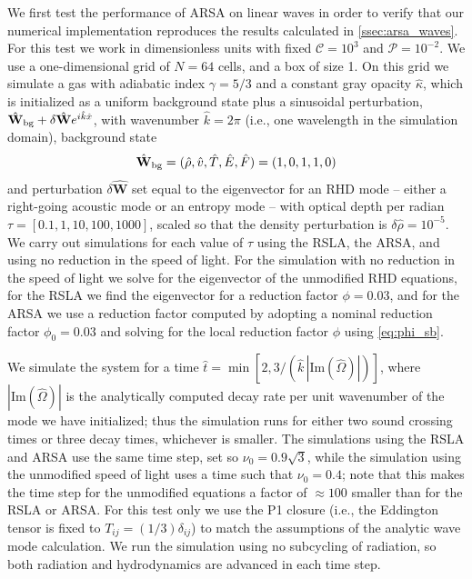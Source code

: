 \documentclass[preprint,12pt,authoryear]{elsarticle}
\newcommand{\hatt}{\hat{t}}
\newcommand{\hrho}{\hat{\rho}}
\newcommand{\hk}{\hat{k}}
\newcommand{\hE}{\hat{E}}
\newcommand{\hv}{\hat{v}}
\newcommand{\hF}{\hat{F}}
\newcommand{\hx}{\hat{x}}
\newcommand{\hT}{\hat{T}}
\newcommand{\hOmega}{\hat{\Omega}}
\newcommand{\hvecW}{{\hat{\mathbf{W}}}}
\newcommand{\calC}{\mathcal{C}}
\newcommand{\calP}{\mathcal{P}}
\begin{document}
We first test the performance of ARSA on linear waves in order to verify that our numerical implementation reproduces the results calculated in \autoref{ssec:arsa_waves}. For this test we work in dimensionless units with fixed $\calC = 10^3$ and $\calP = 10^{-2}$. We use a one-dimensional grid of $N=64$ cells, and a box of size 1. On this grid we simulate a gas with adiabatic index $\gamma=5/3$ and a constant gray opacity $\hat{\kappa}$, which is initialized as a uniform background state plus a sinusoidal perturbation, $\hvecW_{\rm bg} + \delta\hvecW e^{i\hk\hx}$, with wavenumber $\hk = 2\pi$ (i.e., one wavelength in the simulation domain), background state
\begin{equation}
    \hvecW_{\rm bg} = (\hrho, \hv, \hT, \hE, \hF) =  (1,0,1,1,0)
\end{equation}
and perturbation $\delta\hvecW$ set equal to the eigenvector for an RHD mode -- either a right-going acoustic mode or an entropy mode -- with optical depth per radian $\tau = [0.1, 1, 10, 100, 1000]$, scaled so that the density perturbation is $\delta\hrho =10^{-5}$. We carry out simulations for each value of $\tau$ using the RSLA, the ARSA, and using no reduction in the speed of light. For the simulation with no reduction in the speed of light we solve for the eigenvector of the unmodified RHD equations, for the RSLA we find the eigenvector for a reduction factor $\phi = 0.03$, and for the ARSA we use a reduction factor computed by adopting a nominal reduction factor $\phi_0 = 0.03$ and solving for the local reduction factor $\phi$ using \autoref{eq:phi_sb}.

We simulate the system for a time $\hatt = \min[2, 3/(\hk\,|\mathrm{Im}(\hOmega)|)]$, where $|\mathrm{Im}(\hOmega)|$ is the analytically computed decay rate per unit wavenumber of the mode we have initialized; thus the simulation runs for either two sound crossing times or three decay times, whichever is smaller. The simulations using the RSLA and ARSA use the same time step, set so $\nu_0 = 0.9\sqrt{3}$, while the simulation using the unmodified speed of light uses a time such that $\nu_0 = 0.4$; note that this makes the time step for the unmodified equations a factor of $\approx 100$ smaller than for the RSLA or ARSA. For this test only we use the P1 closure (i.e., the Eddington tensor is fixed to $T_{ij} = (1/3)\delta_{ij}$) to match the assumptions of the analytic wave mode calculation. We run the simulation using no subcycling of radiation, so both radiation and hydrodynamics are advanced in each time step.
\end{document}
